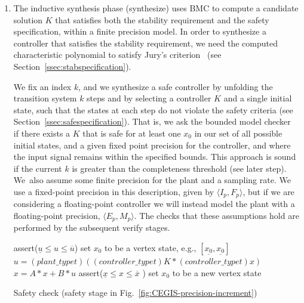 \documentclass[twocolumn]{autart}    %
\begin{document}
\begin{enumerate}

\item The inductive synthesis phase ({\sc synthesize}) uses BMC to compute a
candidate solution $K$ that satisfies both the stability requirement and the safety specification, 
within a finite precision model.  
In order to synthesize a controller that satisfies the stability requirement, 
we need the computed characteristic polynomial to satisfy Jury's criterion~\cite{fadali} (see Section~\ref{ssec:stabspecification}). 

We fix an index $k$, 
and we synthesize a safe controller by
unfolding the transition system $k$ steps and by selecting a controller $K$ and a single initial state, 
such that the states at each step do not violate the safety criteria (see Section~\ref{ssec:safespecification}).    
That is, we ask the bounded model checker~\cite{ClarkeKL04} if there exists a $K$ that is safe for at least one $x_0$ in our set of all possible initial states, and a given fixed point precision for the controller, and where the input signal remains within the specified bounds.
This approach is sound if the current $k$ is greater than the completeness threshold (see later step).  
We~also assume some finite precision for the plant and a sampling rate. We use a fixed-point precision in this description, given by $\langle I_p,F_p\rangle$, but if we are considering a floating-point controller we will instead model the plant with a floating-point precision, $\langle E_p,M_p\rangle$.
The checks that these assumptions hold are performed by the subsequent {\sc verify} stages. 




\begin{algorithm}[]
\begin{algorithmic}[1]
\State assert($ \underline{u}  \leq u \leq \overline{u}$)
 \State set $x_0$ to be a vertex state, e.g., $[\underline{x_0},\underline{x_0}]$	
		\State $u = (plant\_typet)((controller\_typet)K * (controller\_typet) x)$
		\State $x = A * x + B * u$
		\State assert($\underline{x} \leq x \leq \overline{x}$ )
  	\EndFor
  	\State set $x_0$ to be a new vertex state
  	\EndFor
\EndFunction
\end{algorithmic}
\caption{Safety check ({\sc safety} stage in Fig.~\ref{fig:CEGIS-precision-increment})\label{alg:safetycheck}}
\end{algorithm}


\end{enumerate}
\end{document}
